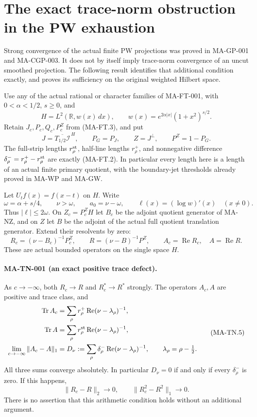 \section{The exact trace-norm obstruction in the PW exhaustion}
\label{sec:pw-trace-norm-convergence}

Strong convergence of the actual finite PW projections was proved
in MA-GP-001 and MA-CGP-003.  It does not by itself imply trace-norm
convergence of an uncut smoothed projection.  The following result
identifies that additional condition exactly, and proves its
sufficiency on the original weighted Hilbert space.

Use any of the actual rational or character families of MA-FT-001,
with \(0<\alpha<1/2\), \(s\ge0\), and
\[
 H=L^2(\mathbb R,w(x)\,dx),\qquad
 w(x)=e^{2\alpha|x|}(1+x^2)^{s/2}.
 \tag{MA-TN.1}
\]
Retain \(J_c,P_c,Q_c,P_c^Z\) from (MA-FT.3), and put
\[
 J=\overline{T_{1/2}\mathcal I}^{\,H},\qquad
 P_G=P_J,\qquad Z=J^\perp,\qquad P^Z=1-P_G.
 \tag{MA-TN.2}
\]
The full-strip lengths \(r_\rho^{\rm st}\), half-line lengths
\(r_\rho^+\), and nonnegative difference
\(\delta_\rho^-=r_\rho^+-r_\rho^{\rm st}\) are exactly (MA-FT.2).
In particular every length here is a length of an actual
finite primary quotient, with the boundary-jet thresholds
already proved in MA-WP and MA-GW.

Let \(U_tf(x)=f(x-t)\) on \(H\).  Write
\[
 \omega=\alpha+s/4,\qquad \nu>\omega,\qquad
 a_0=\nu-\omega,\qquad
 \ell(x)=(\log w)'(x)\quad(x\ne0).
 \tag{MA-TN.3}
\]
Thus \(|\ell|\le2\omega\).  On \(Z_c=P_c^ZH\) let \(B_c\)
be the adjoint quotient generator of MA-NZ, and on \(Z\)
let \(B\) be the adjoint of the actual full quotient
translation generator.  Extend their resolvents by zero:
\[
 R_c=(\nu-B_c)^{-1}P_c^Z,\qquad
 R=(\nu-B)^{-1}P^Z,\qquad
 A_c=\operatorname{Re}R_c,\quad A=\operatorname{Re}R.
 \tag{MA-TN.4}
\]
These are actual bounded operators on the single space \(H\).

\paragraph{MA-TN-001 (an exact positive trace defect).}
As \(c\to-\infty\), both \(R_c\to R\) and \(R_c^*\to R^*\)
strongly.  The operators \(A_c,A\) are positive and trace class,
and
\[
 \begin{aligned}
 \operatorname{Tr}A_c
   &=\sum_\rho r_\rho^+
                 \operatorname{Re}(\nu-\lambda_\rho)^{-1},\\
 \operatorname{Tr}A
   &=\sum_\rho r_\rho^{\rm st}
                 \operatorname{Re}(\nu-\lambda_\rho)^{-1},\\
 \lim_{c\to-\infty}\|A_c-A\|_1
   &=D_\nu:=
       \sum_\rho\delta_\rho^-
                 \operatorname{Re}(\nu-\lambda_\rho)^{-1},
       \qquad \lambda_\rho=\rho-\tfrac12.
 \end{aligned}
 \tag{MA-TN.5}
\]
All three sums converge absolutely.  In particular \(D_\nu=0\)
if and only if every \(\delta_\rho^-\) is zero.  If this happens,
\[
              \|R_c-R\|_2\longrightarrow0,\qquad
              \|R_c^2-R^2\|_1\longrightarrow0.
 \tag{MA-TN.6}
\]
There is no assertion that this arithmetic condition holds
without an additional argument.

